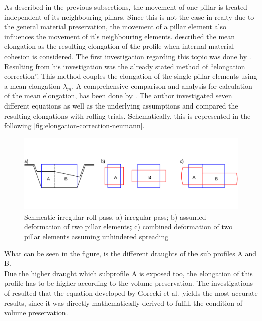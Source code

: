 \documentclass[11pt]{PyRollDocs}
\begin{document}
    As described in the previous subsections, the movement of one pillar is treated independent of its neighbouring pillars.
    Since this is not the case in realty due to the general material preservation, the movement of a pillar element also influences the movement of it's neighbouring elements.
    \textcite{Neumann1975} described the mean elongation as the resulting elongation of the profile when internal material cohesion is considered.
    The first investigation regarding this topic was done by \textcite{Lendl1948}.
    Resulting from his investigation was the already stated method of \enquote{elongation correction}.
    This method couples the elongation of the single pillar elements using a mean elongation $\lambda_{m}$.
    A comprehensive comparison and analysis for calculation of the mean elongation, has been done by \textcite{Wusatowski1957}.
    The author investigated seven different equations as well as the underlying assumptions and compared the resulting elongations with rolling trials.
    Schematically, this is represented in the following \autoref{fig:elongation-correction-neumann}.

    \begin{figure}
        \includegraphics[width=\textwidth]{img/elongation-correction}
        \caption{Schmeatic irregular roll pass, a) irregular pass; b) assumed deformation of two pillar elements; c) combined deformation of two pillar elements assuming unhindered spreading}
        \label{fig:elongation-correction-neumann}
    \end{figure}

    What can be seen in the figure, is the different draughts of the sub profiles A and B.\\
    Due the higher draught which subprofile A is exposed too, the elongation of this profile has to be higher according to the volume preservation.
    The investigations of \textcite{Wusatowski1957} resulted that the equation developed by Gorecki et al.~yields the most accurate results, since it was directly mathematically derived to fulfill the condition of volume preservation.
\end{document}
